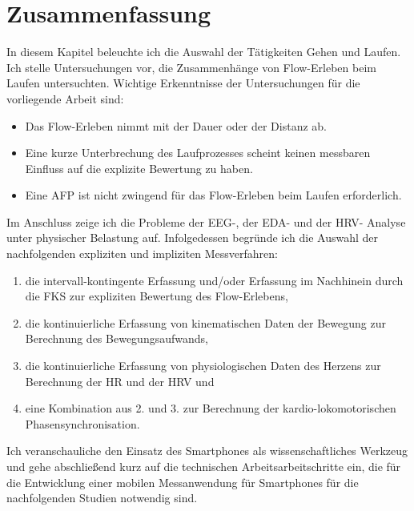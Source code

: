 

\section{Zusammenfassung} 

\label{sec:zusammenfassung_4}

In diesem Kapitel beleuchte ich die Auswahl der Tätigkeiten Gehen und Laufen. Ich stelle Untersuchungen vor, die Zusammenhänge von Flow-Erleben beim Laufen untersuchten. Wichtige Erkenntnisse der Untersuchungen für die vorliegende Arbeit sind: 
\begin{itemize}

	\item Das Flow-Erleben nimmt mit der Dauer oder der Distanz ab.

	\item Eine kurze Unterbrechung des Laufprozesses scheint keinen messbaren Einfluss auf die explizite Bewertung zu haben. 

	\item Eine \ac{AFP} ist nicht zwingend für das Flow-Erleben beim Laufen erforderlich.
	
\end{itemize}

	Im Anschluss zeige ich die Probleme der \ac{EEG}-, der \ac{EDA}- und der \ac{HRV}- Analyse unter physischer Belastung auf. Infolgedessen begründe ich die Auswahl der nachfolgenden expliziten und impliziten Messverfahren:
	
\begin{enumerate}

	\item die intervall-kontingente Erfassung und/oder Erfassung im Nachhinein durch die \ac{FKS} zur expliziten Bewertung des Flow-Erlebens, 

	\item die kontinuierliche Erfassung von kinematischen Daten der Bewegung zur Berechnung des Bewegungsaufwands, 

	\item die kontinuierliche Erfassung von physiologischen Daten des Herzens zur Berechnung der \ac{HR} und der \ac{HRV} und 

	\item eine Kombination aus 2. und 3. zur Berechnung der kardio-lokomotorischen Phasensynchronisation.
\end{enumerate}

Ich veranschauliche den Einsatz des Smartphones als wissenschaftliches Werkzeug und gehe abschließend kurz auf die technischen Arbeitsarbeitschritte ein, die für die Entwicklung einer mobilen Messanwendung für Smartphones für die nachfolgenden Studien notwendig sind.

